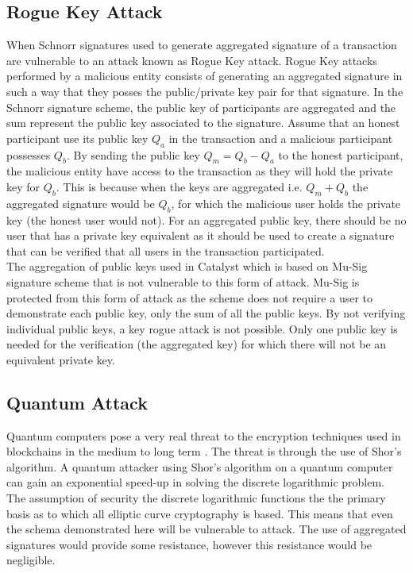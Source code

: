\subsection{Rogue Key Attack}

When Schnorr signatures used to generate aggregated signature of a transaction are vulnerable to an attack known as Rogue Key attack. Rogue Key attacks performed by a malicious entity consists of generating an aggregated signature in such a way that they posses the public/private key pair for that signature. In the Schnorr signature scheme, the public key of participants are aggregated and the sum represent the public key associated to the signature. Assume that an honest participant use its public key $Q_a$ in the transaction and a malicious participant possesses $Q_b$. By sending the public key $Q_m = Q_b - Q_a$ to the honest participant, the malicious entity have access to the transaction as they will hold the private key for $Q_b$. This is because when the keys are aggregated i.e. $Q_m + Q_b$ the aggregated signature would be $Q_b$, for which the malicious user holds the private key (the honest user would not). For an aggregated public key, there should be no user that has a private key equivalent as it should be used to create a signature that can be verified that all users in the transaction participated. \\ 	

The aggregation of public keys used in Catalyst which is based on Mu-Sig \cite{musig} signature scheme that is not vulnerable to this form of attack. Mu-Sig is protected from this form of attack as the scheme does not require a user to demonstrate each public key, only the sum of all the public keys. By not verifying individual public keys, a key rogue attack is not possible. Only one public key is needed for the verification (the aggregated key) for which there will not be an equivalent private key.

\subsection{Quantum Attack}

Quantum computers pose a very real threat to the encryption techniques used in blockchains in the medium to long term \cite{agarwal} \cite{kearney}. The threat is through the use of Shor's algorithm. A quantum attacker using Shor's algorithm on a quantum computer can gain an exponential speed-up in solving the discrete logarithmic problem. The assumption of security the discrete logarithmic functions the the primary basis as to which all elliptic curve cryptography is based. This means that even the schema demonstrated here will be vulnerable to attack. The use of aggregated signatures would provide some resistance, however this resistance would be negligible. \\

